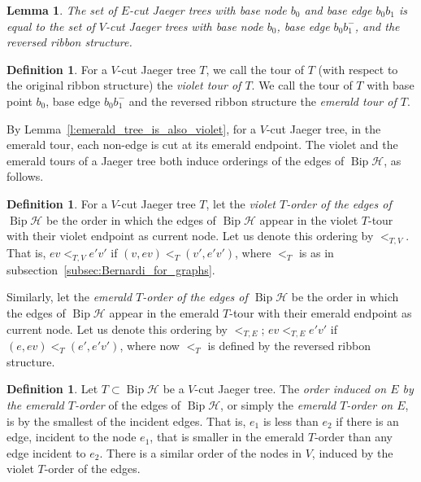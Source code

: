 \documentclass[10pt]{amsart}
\newtheorem{lemma}[theo]{Lemma}
\theoremstyle{definition}\newtheorem{defi}[theo]{Definition}
\theoremstyle{remark}\newtheorem{rema}[theo]{Remark}
\newcommand{\HH}{\mathcal H}
\DeclareMathOperator{\bip}{Bip}
\begin{document}
\begin{lemma}\label{c:set_of_emerald_trees_eq_violet}
The set of $E$-cut Jaeger trees with base node $b_0$ and base edge $b_0b_1$ is equal to the set of $V$-cut Jaeger trees with base node $b_0$, base edge $b_0b_1^-$, and the reversed ribbon structure.
\end{lemma}

\begin{defi}
For a $V$-cut Jaeger tree $T$, we call the tour of $T$ (with respect to the original ribbon structure) the \emph{violet tour of $T$}. We call the tour of $T$ with base point $b_0$, base edge $b_0b_1^-$ and the reversed ribbon structure the \emph{emerald tour of $T$}.
\end{defi}

By Lemma~\ref{l:emerald_tree_is_also_violet}, for a $V$-cut Jaeger tree, in the emerald tour, each non-edge is cut at its emerald endpoint. The violet and the emerald tours of a Jaeger tree both induce orderings of the edges of $\bip \HH$, as follows. 

\begin{defi}\label{def:T-order}
For a $V$-cut Jaeger tree $T$, let the \emph{violet $T$-order of the edges of $\bip \HH$} be the order in which the edges of $\bip \HH$ appear in the violet $T$-tour with their violet endpoint as current node. Let us denote this ordering by $<_{T,V}$. That is, $ev <_{T,V} e'v'$ if $(v,ev)<_T (v', e'v')$, where $<_T$ is as in subsection~\ref{subsec:Bernardi_for_graphs}.

Similarly, let the \emph{emerald $T$-order of the edges of $\bip \HH$} be the order in which the edges of $\bip \HH$ appear in the emerald $T$-tour with their emerald endpoint as current node. Let us denote this ordering by $<_{T,E}$; \ie $ev <_{T,E} e'v'$ if $(e,ev)<_T (e', e'v')$, where now $<_T$ is defined by the reversed ribbon structure.
\end{defi}

\begin{defi}\label{def:induced_order}
Let $T\subset\bip\HH$ be a $V$-cut Jaeger tree. The \emph{order induced on $E$ by the emerald $T$-order} of the edges of $\bip \HH$, or simply the \emph{emerald $T$-order on $E$}, is by the smallest of the incident edges. That is, $e_1$ is less than $e_2$ if there is an edge, incident to the node $e_1$, that is smaller in the emerald $T$-order than any edge incident to $e_2$. There is a similar order of the nodes in $V$, induced by the violet $T$-order of the edges.
\end{defi}
\end{document}
